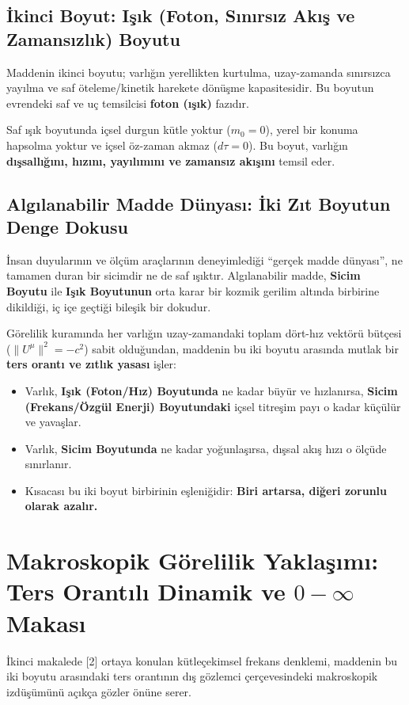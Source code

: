 \documentclass[12pt,a4paper]{article}
\begin{document}
\subsection{İkinci Boyut: Işık (Foton, Sınırsız Akış ve Zamansızlık) Boyutu}

Maddenin ikinci boyutu; varlığın yerellikten kurtulma, uzay-zamanda sınırsızca yayılma ve saf öteleme/kinetik harekete dönüşme kapasitesidir. Bu boyutun evrendeki saf ve uç temsilcisi \textbf{foton (ışık)} fazıdır. 

Saf ışık boyutunda içsel durgun kütle yoktur ($m_0 = 0$), yerel bir konuma hapsolma yoktur ve içsel öz-zaman akmaz ($d\tau = 0$). Bu boyut, varlığın \textbf{dışsallığını, hızını, yayılımını ve zamansız akışını} temsil eder.

\subsection{Algılanabilir Madde Dünyası: İki Zıt Boyutun Denge Dokusu}

İnsan duyularının ve ölçüm araçlarının deneyimlediği ``gerçek madde dünyası'', ne tamamen duran bir sicimdir ne de saf ışıktır. Algılanabilir madde, \textbf{Sicim Boyutu} ile \textbf{Işık Boyutunun} orta karar bir kozmik gerilim altında birbirine dikildiği, iç içe geçtiği bileşik bir dokudur.

Görelilik kuramında her varlığın uzay-zamandaki toplam dört-hız vektörü bütçesi ($\|U^\mu\|^2 = -c^2$) sabit olduğundan, maddenin bu iki boyutu arasında mutlak bir \textbf{ters orantı ve zıtlık yasası} işler:
\begin{itemize}
    \item Varlık, \textbf{Işık (Foton/Hız) Boyutunda} ne kadar büyür ve hızlanırsa, \textbf{Sicim (Frekans/Özgül Enerji) Boyutundaki} içsel titreşim payı o kadar küçülür ve yavaşlar.
    \item Varlık, \textbf{Sicim Boyutunda} ne kadar yoğunlaşırsa, dışsal akış hızı o ölçüde sınırlanır.
    \item Kısacası bu iki boyut birbirinin eşleniğidir: \textbf{Biri artarsa, diğeri zorunlu olarak azalır.}
\end{itemize}

\section{Makroskopik Görelilik Yaklaşımı: Ters Orantılı Dinamik ve $0 - \infty$ Makası}

İkinci makalede [2] ortaya konulan kütleçekimsel frekans denklemi, maddenin bu iki boyutu arasındaki ters orantının dış gözlemci çerçevesindeki makroskopik izdüşümünü açıkça gözler önüne serer. 
\end{document}
